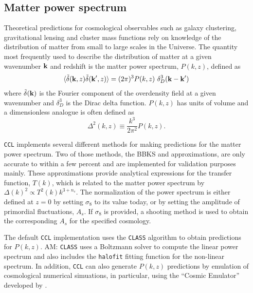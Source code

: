 \documentclass[\docopts]{\docclass}
\newcommand{\elisa}[1]{\textcolor{green!10!orange!90!}{EC: #1}}
\newcommand{\Mead}[1]{\textcolor{red!50!cyan}{AM: #1}}
\newcommand{\ccl}{{\tt CCL}\xspace}
\newcommand{\halofit}{{\tt halofit}\xspace}
\newcommand{\class}{{\tt CLASS}\xspace}
\begin{document}
\subsection{Matter power spectrum}
\label{sec:matterps}


Theoretical predictions for cosmological observables such as galaxy clustering, gravitational lensing and cluster mass functions rely on knowledge of the distribution of matter from small to large scales in the Universe. The quantity most frequently used to describe the distribution of matter at a given wavenumber ${\bf k}$ and redshift is the matter power spectrum, $P(k,z)$, defined as
\begin{equation}
  \langle \tilde\delta({\bf k},z)\tilde\delta({\bf k}^\prime,z)\rangle = (2\pi)^3P(k,z)\
\delta_D^3({\bf k}-{\bf k}')
\end{equation}
where $\tilde\delta({\bf k})$ is the Fourier component of the overdensity field at a given wavenumber and $\delta_D^3$ is the Dirac delta function. $P(k,z)$ has units of volume and a dimensionless analogue is often defined as
\begin{equation}
  \Delta^2(k,z) \equiv \frac{k^3}{2\pi^2}P(k,z).
\end{equation}

\ccl implements several different methods for making predictions for the matter power spectrum. Two of those methods, the BBKS \citep{BBKS} and \citet{1998ApJ...496..605E} approximations, are only accurate to within a few percent and are implemented for validation purposes mainly. These approximations provide analytical expressions for the transfer function, $T(k)$, which is related to the matter power spectrum by $\Delta(k)^2 \propto T^2(k) k^{3+n_s}$. The normalization of the power spectrum is either defined at $z=0$ by setting $\sigma_8$ to its value today, or by setting the amplitude of primordial fluctuations, $A_s$. If $\sigma_8$ is provided, a shooting method is used to obtain the corresponding $A_s$ for the specified cosmology.

The default \ccl implementation uses the \class algorithm \citet{class} to obtain predictions for $P(k,z)$. \Mead{\class uses a Boltzmann solver to compute the linear power spectrum and also includes the \halofit \citep{Smith2003,CLASS_halofit} fitting function for the non-linear spectrum.} In addition, \ccl can also generate $P(k,z)$ predictions by emulation of cosmological numerical simuations, in particular, using the ``Cosmic Emulator'' developed by \citet{Lawrence17}.
\end{document}
